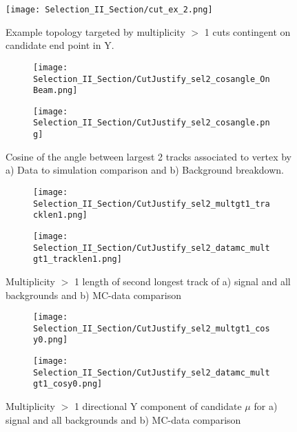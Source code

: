 \documentclass{article}
\begin{document}
\begin{figure}[t!]
  \centering
  \texttt{[image: Selection\_II\_Section/cut\_ex\_2.png]}
  \caption{ Example topology targeted by multiplicity $>$ 1 cuts contingent on candidate end point in Y. }
\label{fig:cut_ex_2}
\end{figure}



\begin{figure}[t!]
\centering
  \begin{subfigure}[t]{0.4\textwidth}
    \centering
\texttt{[image: Selection\_II\_Section/CutJustify\_sel2\_cosangle\_OnBeam.png]}
  \caption{ }
  \end{subfigure} 
  \hspace{20mm}
  \begin{subfigure}[t]{0.4\textwidth}
    \centering
\texttt{[image: Selection\_II\_Section/CutJustify\_sel2\_cosangle.png]}
  \caption{ }
  \end{subfigure} 
\caption{Cosine of the angle between largest 2 tracks associated to vertex by a) Data to simulation comparison and b) Background breakdown. }
\label{fig:cutjust_sel2_cosangle}
\end{figure}

\begin{figure}[t!]
\centering
 \begin{subfigure}[t]{0.4\textwidth}
    \centering
\texttt{[image: Selection\_II\_Section/CutJustify\_sel2\_multgt1\_tracklen1.png]}
 \caption{ }
  \end{subfigure} 
  \hspace{20mm}
  \begin{subfigure}[t]{0.4\textwidth}
    \centering
\texttt{[image: Selection\_II\_Section/CutJustify\_sel2\_datamc\_multgt1\_tracklen1.png]}
 \caption{ }
  \end{subfigure} 
\caption{Multiplicity $>$ 1 length of second longest track of a) signal and all backgrounds and b) MC-data comparison }
\label{fig:cutjust_sel2_multgt1_tracklen1}
\end{figure}

\begin{figure}[t!]
\centering
  \begin{subfigure}[t]{0.4\textwidth}
    \centering
\texttt{[image: Selection\_II\_Section/CutJustify\_sel2\_multgt1\_cosy0.png]}
 \caption{ }
  \end{subfigure} 
  \hspace{20mm}
  \begin{subfigure}[t]{0.4\textwidth}
    \centering
\texttt{[image: Selection\_II\_Section/CutJustify\_sel2\_datamc\_multgt1\_cosy0.png]}
 \caption{ }
  \end{subfigure} 
\caption{Multiplicity $>$ 1 directional Y component of candidate $\mu$ for a) signal and all backgrounds and b) MC-data comparison }
\label{fig:cutjust_sel2_multgt1_dcosy}
\end{figure}
\end{document}
